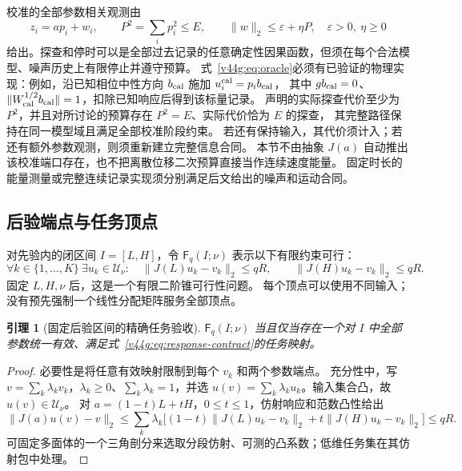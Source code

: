 \documentclass[11pt,a4paper]{article}
\numberwithin{equation}{section}
\newtheorem{lemma}[theorem]{引理}
\theoremstyle{definition}
\begin{document}
校准的全部参数相关观测由
\begin{equation}
 z_i=ap_i+w_i,\qquad
 P^2=\sum_i p_i^2\le E,\qquad
 \|w\|_2\le\varepsilon+\eta P,
 \quad \varepsilon>0,\ \eta\ge0
 \label{v44g:eq:oracle}
\end{equation}
给出。探查和停时可以是全部过去记录的任意确定性因果函数，但须在每个合法模型、噪声历史上有限停止并遵守预算。
式~\eqref{v44g:eq:oracle}必须有已验证的物理实现：例如，沿已知相位中性方向 $b_{\rm cal}$ 施加 $u_i^{\rm cal}=p_i b_{\rm cal}$，
其中 $gb_{\rm cal}=0$、$\|W_{\rm cal}^{1/2}b_{\rm cal}\|=1$，扣除已知响应后得到该标量记录。
声明的实际探查代价至少为 $P^2$，并且对所讨论的预算存在 $P^2=E$、实际代价恰为 $E$ 的探查，
其完整路径保持在同一模型域且满足全部校准阶段约束。
若还有保持输入，其代价须计入；若还有额外参数观测，则须重新建立完整信息合同。
本节不由抽象 $J(a)$ 自动推出该校准端口存在，也不把离散位移二次预算直接当作连续速度能量。
固定时长的能量测量或完整连续记录实现须分别满足后文给出的噪声和运动合同。

\subsection{后验端点与任务顶点}
对先验内的闭区间 $I=[L,H]$，令 $\mathsf F_q(I;\nu)$ 表示以下有限约束可行：
\begin{equation}
 \forall k\in\{1,\ldots,K\}\ \exists u_k\in\mathcal U_\nu:
 \quad
 \|J(L)u_k-v_k\|_2\le qR,\qquad
 \|J(H)u_k-v_k\|_2\le qR.
 \label{v44g:eq:vertex-socp}
\end{equation}
固定 $L,H,\nu$ 后，这是一个有限二阶锥可行性问题。
每个顶点可以使用不同输入；没有预先强制一个线性分配矩阵服务全部顶点。

\begin{lemma}[固定后验区间的精确任务验收]
\label{v44g:lem:vertices}
$\mathsf F_q(I;\nu)$ 当且仅当存在一个对 $I$ 中全部参数统一有效、满足式~\eqref{v44g:eq:response-contract}的任务映射。
\end{lemma}
\begin{proof}
必要性是将任意有效映射限制到每个 $v_k$ 和两个参数端点。
充分性中，写 $v=\sum_k\lambda_kv_k$，$\lambda_k\ge0$、$\sum_k\lambda_k=1$，并选
$u(v)=\sum_k\lambda_ku_k$。输入集合凸，故 $u(v)\in\mathcal U_\nu$。
对 $a=(1-t)L+tH$，$0\le t\le1$，仿射响应和范数凸性给出
\[
 \|J(a)u(v)-v\|_2
 \le\sum_k\lambda_k\big[(1-t)\|J(L)u_k-v_k\|_2
             +t\|J(H)u_k-v_k\|_2\big]\le qR.
\]
可固定多面体的一个三角剖分来选取分段仿射、可测的凸系数；低维任务集在其仿射包中处理。
\end{proof}
\end{document}

